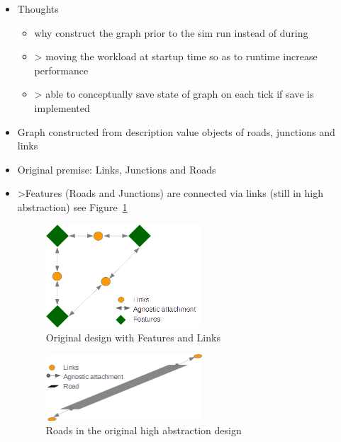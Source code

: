 \begin{itemize}
	\item Thoughts
	\begin{itemize}
		\item why construct the graph prior to the sim run instead of during	
		\item > moving the workload at startup time so as to runtime increase performance
		\item > able to conceptually save state of graph on each tick if save is implemented
	\end{itemize}
	\item Graph constructed from description value objects of roads, junctions and links
	\item Original premise: Links, Junctions and Roads
	\item >Features (Roads and Junctions) are connected via links (still in high abstraction) see Figure~\ref{fig:FeatureConnect}

\begin{figure}
	\vspace{1.5em}
  	\caption{Original design with Features and Links}
  	\label{fig:FeatureConnect}
  	\centering
	\includegraphics[width=0.55\textwidth]{figs/graphConstruction/OriginalConnections.png}
  	\vspace{1.5em}
\end{figure}
	
\begin{figure}
	\vspace{1.5em}
  	\caption{Roads in the original high abstraction design}
  	\label{fig:RoadsOriginal}
  	\centering
	\includegraphics[width=0.55\textwidth]{figs/graphConstruction/OriginalRoads.png}
  	\vspace{1.5em}
\end{figure}	


\end{itemize}
